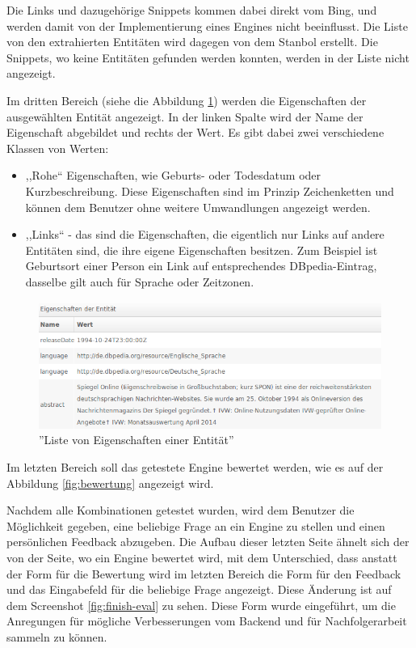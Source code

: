 Die Links und dazugehörige Snippets kommen dabei direkt vom Bing, und werden damit von der Implementierung eines Engines nicht beeinflusst. Die Liste von den extrahierten Entitäten wird dagegen von dem Stanbol erstellt. Die Snippets, wo keine Entitäten gefunden werden konnten, werden in der Liste nicht angezeigt.

Im dritten Bereich (siehe die Abbildung \ref{fig:eval-props}) werden die Eigenschaften der ausgewählten Entität angezeigt. In der linken Spalte wird der Name der Eigenschaft abgebildet und rechts der Wert. Es gibt dabei zwei verschiedene Klassen von Werten:
\begin{itemize}
\item ,,Rohe`` Eigenschaften, wie Geburts- oder Todesdatum oder Kurzbeschreibung. Diese Eigenschaften sind im Prinzip Zeichenketten und können dem Benutzer ohne weitere Umwandlungen angezeigt werden.
\item ,,Links`` - das sind die Eigenschaften, die eigentlich nur Links auf andere Entitäten sind, die ihre eigene Eigenschaften besitzen. Zum Beispiel ist Geburtsort einer Person ein Link auf entsprechendes DBpedia-Eintrag, dasselbe gilt auch für Sprache oder Zeitzonen.
\end{itemize}

\begin{figure}
\centering
\includegraphics[width=1\textwidth]{Bilder/eval-step03.png}
\caption{''Liste von Eigenschaften einer Entität''}
\label{fig:eval-props}
\end{figure}

Im letzten Bereich soll das getestete Engine bewertet werden, wie es auf der Abbildung \ref{fig:bewertung} angezeigt wird.

Nachdem alle Kombinationen getestet wurden, wird dem Benutzer die Möglichkeit gegeben, eine beliebige Frage an ein Engine zu stellen und einen persönlichen Feedback abzugeben. Die Aufbau dieser letzten Seite ähnelt sich der von der Seite, wo ein Engine bewertet wird, mit dem Unterschied, dass anstatt der Form für die Bewertung wird im letzten Bereich die Form für den Feedback und das Eingabefeld für die beliebige Frage angezeigt. Diese Änderung ist auf dem Screenshot \ref{fig:finish-eval} zu sehen. Diese Form wurde eingeführt, um die Anregungen für mögliche Verbesserungen vom Backend und für Nachfolgerarbeit sammeln zu können.

